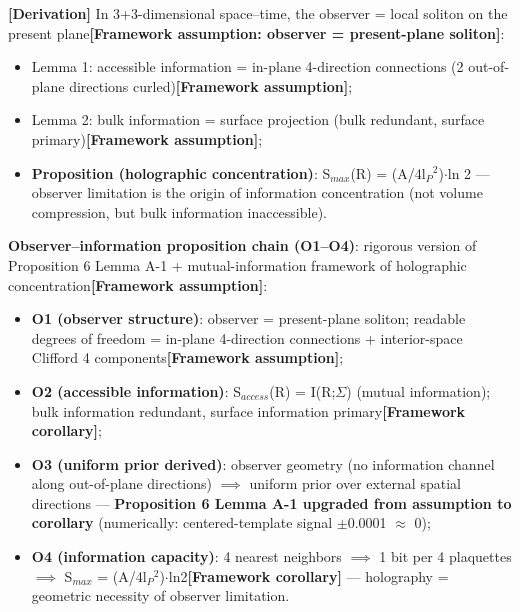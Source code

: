 \documentclass[12pt]{article}
\newcommand{\mtag}[1]{\textbf{[#1]}}
\newcommand{\up}[1]{\ensuremath{^{#1}}}
\newcommand{\down}[1]{\ensuremath{_{#1}}}
\begin{document}
\mtag{Derivation} In 3+3-dimensional space--time, the observer = local soliton on the present plane\mtag{Framework assumption: observer = present-plane soliton}:
\begin{itemize}
\item Lemma 1: accessible information = in-plane 4-direction connections (2 out-of-plane directions curled)\mtag{Framework assumption};
\item Lemma 2: bulk information = surface projection (bulk redundant, surface primary)\mtag{Framework assumption};
\item \textbf{Proposition (holographic concentration)}: S\down{max}(R) = (A/4l\down{P}\up{2})\ensuremath{\cdot}ln 2 --- observer limitation is the origin of information concentration (not volume compression, but bulk information inaccessible).
\end{itemize}

\textbf{Observer--information proposition chain (O1--O4)}: rigorous version of Proposition 6 Lemma A-1 + mutual-information framework of holographic concentration\mtag{Framework assumption}:
\begin{itemize}
\item \textbf{O1 (observer structure)}: observer = present-plane soliton; readable degrees of freedom = in-plane 4-direction connections + interior-space Clifford 4 components\mtag{Framework assumption};
\item \textbf{O2 (accessible information)}: S\down{access}(R) = I(R;\ensuremath{\Sigma}) (mutual information); bulk information redundant, surface information primary\mtag{Framework corollary};
\item \textbf{O3 (uniform prior derived)}: observer geometry (no information channel along out-of-plane directions) \ensuremath{\implies} uniform prior over external spatial directions --- \textbf{Proposition 6 Lemma A-1 upgraded from assumption to corollary} (numerically: centered-template signal \ensuremath{\pm}0.0001 \ensuremath{\approx} 0);
\item \textbf{O4 (information capacity)}: 4 nearest neighbors \ensuremath{\implies} 1 bit per 4 plaquettes \ensuremath{\implies} S\down{max} = (A/4l\down{P}\up{2})\ensuremath{\cdot}ln2\mtag{Framework corollary} --- holography = geometric necessity of observer limitation.
\end{itemize}
\end{document}
